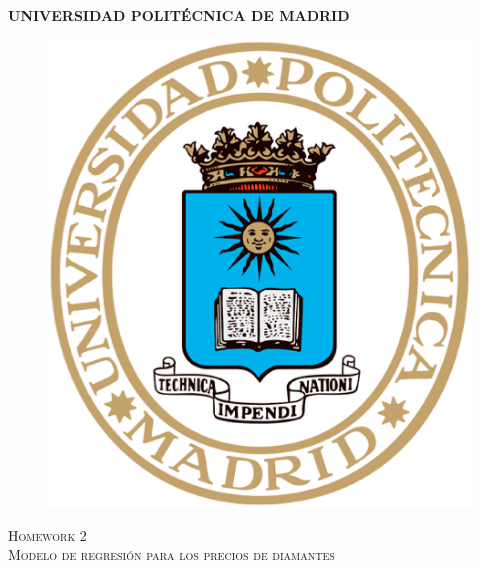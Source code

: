 \begin{titlepage}
		\begin{center}
		\vspace{5 mm}\textbf{\Large UNIVERSIDAD POLITÉCNICA DE MADRID} \par
		\vspace{10 mm}
      			\begin{figure}[htb]
				\begin{center}
					\includegraphics[scale=0.3]{./images/logo-upm.eps}
				\end{center}
			\end{figure}\par
  


      \vspace{20 mm}\textsc{\Large Homework 2 \\ Modelo de regresión para los precios de diamantes } \par
      

\end{center}
\end{titlepage}
